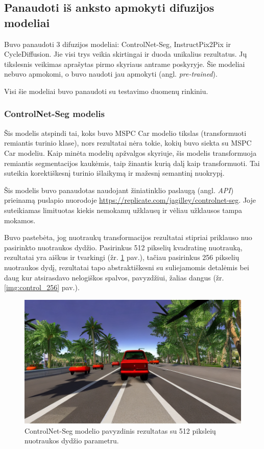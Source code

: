 \documentclass{VUMIFPSbakalaurinis}
\begin{document}
    
    \subsection{Panaudoti iš anksto apmokyti difuzijos modeliai}
        Buvo panaudoti 3 difuzijos modeliai: ControlNet-Seg, InstructPix2Pix ir CycleDiffusion. Jie visi trys veikia skirtingai ir duoda unikalius rezultatus. Jų tikslesnis veikimas aprašytas pirmo skyriaus antrame poskyryje. Šie modeliai nebuvo apmokomi, o buvo naudoti jau apmokyti (angl. \emph{pre-trained}).

        Visi šie modeliai buvo panaudoti su testavimo duomenų rinkiniu.

        \subsubsection{ControlNet-Seg modelis}
            Šis modelis atspindi tai, koks buvo MSPC Car modelio tikslas (transformuoti remiantis turinio klase), nors rezultatai nėra tokie, kokių buvo siekta su MSPC Car modeliu. Kaip minėta modelių apžvalgos skyriuje, šis modelis transformuoja remiantis segmentacijos kaukėmis, taip žinantis kurią dalį kaip transformuoti. Tai suteikia korektiškesnį turinio išlaikymą ir mažesnį semantinį nuokrypį.

            Šis modelis buvo panaudotas naudojant žiniatinklio paslaugą (angl. \emph{API}) prieinamą puslapio nuorodoje \href{https://replicate.com/jagilley/controlnet-seg}{https://replicate.com/jagilley/controlnet-seg}. Joje suteikiamas limituotas kiekis nemokamų užklausų ir vėliau užklausos tampa mokamos.

            Buvo pastebėta, jog nuotraukų transformacijos rezultatai stipriai priklauso nuo pasirinkto nuotraukos dydžio. Pasirinkus 512 pikselių kvadratinę nuotrauką, rezultatai yra aiškus ir tvarkingi (žr. \ref{img:control_512} pav.), tačiau pasirinkus 256 pikselių nuotraukos dydį, rezultatai tapo abstraktiškesni su suliejamomis detalėmis bei daug kur atsirasdavo nelogiškos spalvos, pavyzdžiui, žalias dangus (žr. \ref{img:control_256} pav.). 

            \begin{figure}[H]
                \centering
                \includegraphics[scale=0.5]{img/diffusion/controlnet/512}
                \caption{ControlNet-Seg modelio pavyzdinis rezultatas su 512 piksleių nuotraukos dydžio parametru.}
                \label{img:control_512}
            \end{figure}
\end{document}
